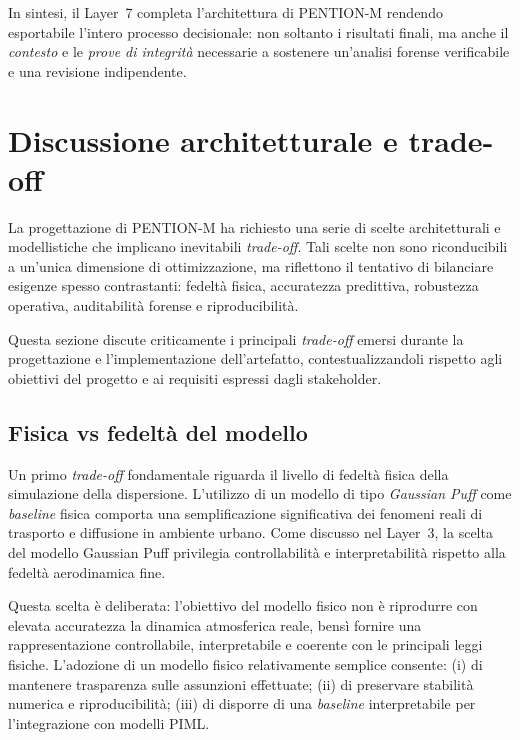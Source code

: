 In sintesi, il Layer~7 completa l’architettura di \textsc{PENTION-M} rendendo esportabile l’intero processo decisionale: non soltanto i risultati finali, ma anche il \emph{contesto} e le \emph{prove di integrità} necessarie a sostenere un’analisi forense verificabile e una revisione indipendente.

\section{Discussione architetturale e trade-off}
\label{sec:arch_tradeoff}

La progettazione di \textsc{PENTION-M} ha richiesto una serie di scelte architetturali e modellistiche che implicano inevitabili \emph{trade-off}.
Tali scelte non sono riconducibili a un’unica dimensione di ottimizzazione, ma riflettono il tentativo di bilanciare esigenze spesso contrastanti: fedeltà fisica, accuratezza predittiva, robustezza operativa, auditabilità forense e riproducibilità.

Questa sezione discute criticamente i principali \textit{trade-off} emersi durante la progettazione e l’implementazione dell’artefatto, contestualizzandoli rispetto agli obiettivi del progetto e ai requisiti espressi dagli stakeholder.

\subsection{Fisica vs fedeltà del modello}

Un primo \textit{trade-off} fondamentale riguarda il livello di fedeltà fisica della simulazione della dispersione.
L’utilizzo di un modello di tipo \emph{Gaussian Puff} come \textit{baseline} fisica comporta una semplificazione significativa dei fenomeni reali di trasporto e diffusione in ambiente urbano.
Come discusso nel Layer~3, la scelta del modello Gaussian Puff privilegia controllabilità e interpretabilità rispetto alla fedeltà aerodinamica fine.

Questa scelta è deliberata: l’obiettivo del modello fisico non è riprodurre con elevata accuratezza la dinamica atmosferica reale, bensì fornire una rappresentazione controllabile, interpretabile e coerente con le principali leggi fisiche.
L’adozione di un modello fisico relativamente semplice consente:
(i) di mantenere trasparenza sulle assunzioni effettuate;
(ii) di preservare stabilità numerica e riproducibilità;
(iii) di disporre di una \textit{baseline} interpretabile per l’integrazione con modelli PIML.

